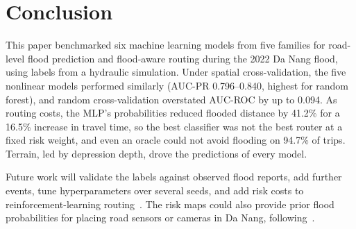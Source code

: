 \section{Conclusion}
\label{sec:conclusion}

This paper benchmarked six machine learning models from five families for road-level flood prediction and flood-aware routing during the 2022 Da Nang flood, using labels from a hydraulic simulation. Under spatial cross-validation, the five nonlinear models performed similarly (AUC-PR 0.796--0.840, highest for random forest), and random cross-validation overstated AUC-ROC by up to 0.094. As routing costs, the MLP's probabilities reduced flooded distance by 41.2\% for a 16.5\% increase in travel time, so the best classifier was not the best router at a fixed risk weight, and even an oracle could not avoid flooding on 94.7\% of trips. Terrain, led by depression depth, drove the predictions of every model.

Future work will validate the labels against observed flood reports, add further events, tune hyperparameters over several seeds, and add risk costs to reinforcement-learning routing~\cite{le2026}. The risk maps could also provide prior flood probabilities for placing road sensors or cameras in Da Nang, following~\cite{pan2026}.
